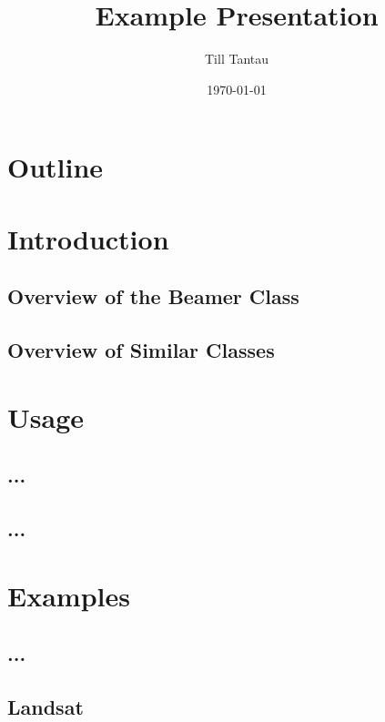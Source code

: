 \documentclass{beamer}
\title{Example Presentation}
\author{Till Tantau}
\date{\today}
\begin{document}
\begin{frame}
           \titlepage
\end{frame}

\section*{Outline}
        \begin{frame}
           \tableofcontents
         \end{frame}

\section{Introduction}
         \subsection{Overview of the Beamer Class}
         \subsection{Overview of Similar Classes}

\section{Usage} \subsection{...} \subsection{...}

\section{Examples} \subsection{...}

\subsection{Landsat}
         \begin{frame}
         \end{frame} %
\end{document}
